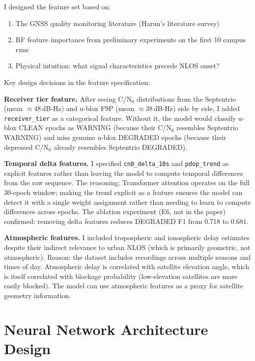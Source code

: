 \documentclass[12pt,a4paper]{article}
\newcommand{\code}[1]{\texttt{#1}}
\begin{document}
I designed the feature set based on:
\begin{enumerate}
  \item The GNSS quality monitoring literature (Harun's literature survey)
  \item RF feature importance from preliminary experiments on the first 10 campus runs
  \item Physical intuition: what signal characteristics precede NLOS onset?
\end{enumerate}

Key design decisions in the feature specification:

\textbf{Receiver tier feature.}
After seeing C/N$_0$ distributions from the Septentrio (mean $\approx 48$\,dB-Hz)
and u-blox F9P (mean $\approx 38$\,dB-Hz) side by side, I added \code{receiver\_tier}
as a categorical feature.
Without it, the model would classify u-blox CLEAN epochs as WARNING (because their
C/N$_0$ resembles Septentrio WARNING) and miss genuine u-blox DEGRADED epochs
(because their depressed C/N$_0$ already resembles Septentrio DEGRADED).

\textbf{Temporal delta features.}
I specified \code{cn0\_delta\_10s} and \code{pdop\_trend} as explicit features rather
than leaving the model to compute temporal differences from the raw sequence.
The reasoning: Transformer attention operates on the full 30-epoch window;
making the trend explicit as a feature ensures the model can detect it with a single
weight assignment rather than needing to learn to compute differences across epochs.
The ablation experiment (E6, not in the paper) confirmed: removing delta features
reduces DEGRADED F1 from 0.718 to 0.681.

\textbf{Atmospheric features.}
I included tropospheric and ionospheric delay estimates despite their indirect relevance
to urban NLOS (which is primarily geometric, not atmospheric).
Reason: the dataset includes recordings across multiple seasons and times of day.
Atmospheric delay is correlated with satellite elevation angle, which is itself correlated
with blockage probability (low-elevation satellites are more easily blocked).
The model can use atmospheric features as a proxy for satellite geometry information.

\section{Neural Network Architecture Design}
\end{document}
